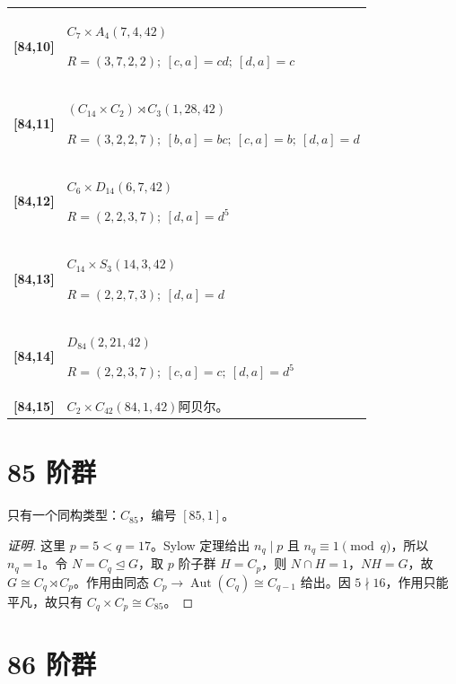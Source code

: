 \documentclass[UTF8,fontset=fandol,11pt,a4paper]{ctexart}
\newcommand{\Aut}{\operatorname{Aut}}\newcommand{\GL}{\operatorname{GL}}\newcommand{\ord}{\operatorname{ord}}\newcommand{\Z}{\mathrm Z}
\begin{document}
\begin{longtable}{@{}p{17mm}>{\raggedright\arraybackslash}p{141mm}@{}}
\textbf{[84,10]} & $C_{7}\times A_{4}$\quad $(7,4,42)$\par\(R=(3,7,2,2);\allowbreak\ [c,a]=cd;\allowbreak\ [d,a]=c\)\\[3pt]

\textbf{[84,11]} & $(C_{14}\times C_{2})\rtimes C_{3}$\quad $(1,28,42)$\par\(R=(3,2,2,7);\allowbreak\ [b,a]=bc;\allowbreak\ [c,a]=b;\allowbreak\ [d,a]=d\)\\[3pt]

\textbf{[84,12]} & $C_{6}\times D_{14}$\quad $(6,7,42)$\par\(R=(2,2,3,7);\allowbreak\ [d,a]=d^{5}\)\\[3pt]

\textbf{[84,13]} & $C_{14}\times S_{3}$\quad $(14,3,42)$\par\(R=(2,2,7,3);\allowbreak\ [d,a]=d\)\\[3pt]

\textbf{[84,14]} & $D_{84}$\quad $(2,21,42)$\par\(R=(2,2,3,7);\allowbreak\ [c,a]=c;\allowbreak\ [d,a]=d^{5}\)\\[3pt]

\textbf{[84,15]} & $C_{2}\times C_{42}$\quad $(84,1,42)$\quad 阿贝尔。\\[3pt]

\end{longtable}\endgroup

\section*{85 阶群}\label{order:85}

只有一个同构类型：$C_{85}$，编号 $[85,1]$。

\begin{proof}[证明]
这里 $p=5<q=17$。Sylow 定理给出 $n_q\mid p$ 且 $n_q\equiv1\pmod q$，所以 $n_q=1$。令 $N=C_q\trianglelefteq G$，取 $p$ 阶子群 $H=C_p$，则 $N\cap H=1$，$NH=G$，故 $G\cong C_q\rtimes C_p$。作用由同态 $C_p\to\Aut(C_q)\cong C_{q-1}$ 给出。因 $5\nmid 16$，作用只能平凡，故只有 $C_q\times C_p\cong C_{85}$。
\end{proof}

\section*{86 阶群}\label{order:86}
\end{document}
